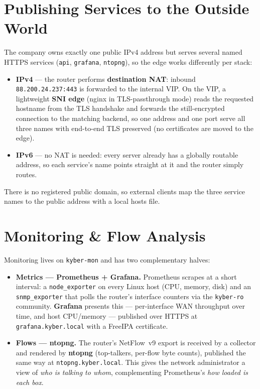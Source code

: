 \documentclass[11pt,a4paper]{article}
\newcommand{\code}[1]{\texttt{#1}}
\begin{document}
\section{Publishing Services to the Outside World}
\label{sec:publish}

The company owns exactly one public IPv4 address but serves several named HTTPS services
(\code{api}, \code{grafana}, \code{ntopng}), so the edge works differently per stack:

\begin{itemize}
  \item \textbf{IPv4} --- the router performs \textbf{destination NAT}: inbound
        \code{88.200.24.237:443} is forwarded to the internal VIP. On the VIP, a lightweight
        \textbf{SNI edge} (nginx in TLS-passthrough mode) reads the requested hostname from
        the TLS handshake and forwards the still-encrypted connection to the matching
        backend, so one address and one port serve all three names with end-to-end TLS
        preserved (no certificates are moved to the edge).
  \item \textbf{IPv6} --- no NAT is needed: every server already has a globally routable
        address, so each service's name points straight at it and the router simply routes.
\end{itemize}

There is no registered public domain, so external clients map the three service names to the
public address with a local hosts file.

\section{Monitoring \& Flow Analysis}
\label{sec:mon}

Monitoring lives on \code{kyber-mon} and has two complementary halves:

\begin{itemize}
  \item \textbf{Metrics --- Prometheus + Grafana.} Prometheus scrapes at a short interval:
        a \code{node\_exporter} on every Linux host (CPU, memory, disk) and an
        \code{snmp\_exporter} that polls the router's interface counters via the
        \code{kyber-ro} community. \textbf{Grafana} presents this --- per-interface WAN
        throughput over time, and host CPU/memory --- published over HTTPS at
        \code{grafana.kyber.local} with a FreeIPA certificate.
  \item \textbf{Flows --- ntopng.} The router's NetFlow~v9 export is received by a collector
        and rendered by \textbf{ntopng} (top-talkers, per-flow byte counts), published the
        same way at \code{ntopng.kyber.local}. This gives the network administrator a view
        of \emph{who is talking to whom}, complementing Prometheus's \emph{how loaded is
        each box}.
\end{itemize}
\end{document}
